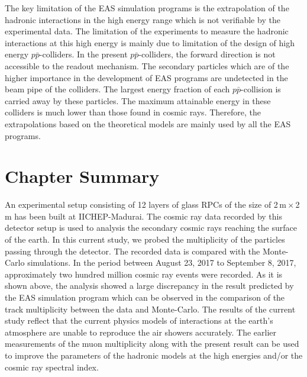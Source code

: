 The key limitation of the EAS simulation programs is the extrapolation
of the hadronic interactions in the high energy range which is not
verifiable by the experimental data. The limitation of the experiments
to measure the hadronic interactions at this high energy is mainly
due to limitation of the design of high energy $p\bar{p}$-colliders.
In the present $p\bar{p}$-colliders, the forward direction is not
accessible to the readout mechanism. The secondary particles
which are of the higher importance in the development of EAS
programs are undetected in the beam pipe of the colliders.
The largest energy fraction of each $p\bar{p}$-collision is
carried away by these particles. The maximum attainable energy
in these colliders is much lower than those found in cosmic rays.
Therefore, the extrapolations based on the theoretical models
are mainly used by all the EAS programs.

\section{Chapter Summary}
An experimental setup consisting of 12 layers of glass RPCs of the size
of 2\,m\,$\times$\,2\,m has been built at IICHEP-Madurai. The cosmic
ray data recorded by this detector setup is used to analysis the
secondary cosmic rays reaching the surface of the earth. In this
current study, we probed the multiplicity of the particles passing
through the detector. The recorded data is compared with the
Monte-Carlo simulations.
In the period between August 23, 2017 to September 8, 2017,
approximately two hundred million cosmic ray events were recorded.
As it is shown above, the analysis showed a large discrepancy in the
result predicted by the EAS simulation program which can be observed
in the comparison of the track multiplicity between the data and
Monte-Carlo. The results of the current study reflect that the current
physics models of interactions at the earth's atmosphere are unable to
reproduce the air showers accurately. The earlier measurements of the
muon multiplicity along with the present result can be used to
improve the parameters of the hadronic models at the high energies
and/or the cosmic ray spectral index.

